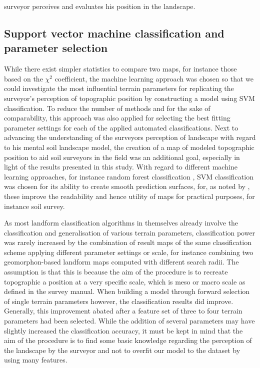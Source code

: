 \documentclass[preprint,12pt,authoryear]{elsarticle}
\begin{document}
surveyor perceives and evaluates his position in the landscape. 

\subsection{Support vector machine classification and parameter selection}
While there exist simpler statistics to compare two maps, for instance those based on the $\chi^2$ coefficient, the machine learning approach was chosen so that we could investigate the most influential terrain parameters for replicating the surveyor's perception of topographic position by constructing a model using  SVM classification. To reduce the number of methods and for the sake of comparability, this approach was also applied for selecting the best fitting parameter settings for each of the applied automated classifications. Next to advancing the understanding of the surveyors perception of landscape with regard to his mental soil landscape model, the creation of a map of modeled topographic position to aid soil surveyors in the field was an additional goal, especially in light of the results presented in this study. With regard to different machine learning approaches, for instance random forest classification \citep{Breiman2001}, SVM classification was chosen for its ability to create smooth prediction surfaces, for, as noted by \cite{Steger2016}, these improve the readability and hence utility of maps for practical purposes, for instance soil survey.

As most landform classification algorithms in themselves already involve the classification and generalisation of various terrain parameters, classification power was rarely increased by the combination of result maps of the same classification scheme applying different parameter settings or scale, for instance combining two geomorphon-based landform maps computed with different search radii. The assumption is that this is because the aim of the procedure is to recreate topographic a position at a very specific scale, which is meso or macro scale as defined in the survey manual. When building a model through forward selection of single terrain parameters however, the classification results did improve. Generally, this improvement abated after a feature set of  three to four terrain parameters had been selected. While the addition of several parameters may have slightly increased the classification accuracy, it must be kept in mind that the aim of the procedure is to find some basic knowledge regarding the perception of the landscape by the surveyor and not to overfit our model to the dataset by using many features.
\end{document}
